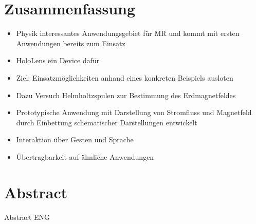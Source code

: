 \section*{Zusammenfassung}
\begin{itemize}
	\item Physik interessantes Anwendungsgebiet für MR und kommt mit ersten Anwendungen bereits zum Einsatz
	\item  HoloLens ein Device dafür
	\item  Ziel: Einsatzmöglichkeiten anhand eines konkreten Beispiels ausloten
	\item Dazu Versuch Helmholtzspulen zur Bestimmung des Erdmagnetfeldes
	\item Prototypische Anwendung mit Darstellung von Stromfluss und Magnetfeld durch Einbettung schematischer Darstellungen entwickelt
	\item Interaktion über Gesten und Sprache
	\item Übertragbarkeit auf ähnliche Anwendungen
\end{itemize}

\section*{Abstract}
Abstract ENG
